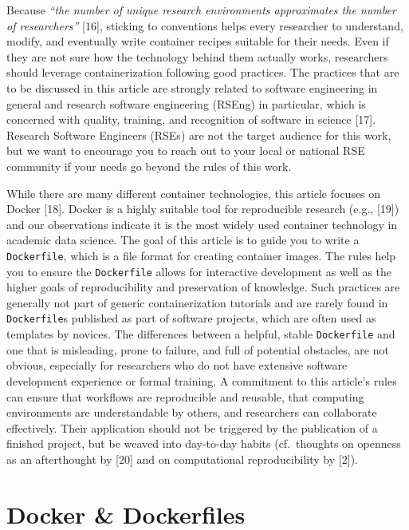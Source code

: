 \documentclass[10pt,letterpaper]{article}
\begin{document}
Because \emph{``the number of unique research environments approximates
the number of researchers''} {[}16{]}, sticking to conventions helps
every researcher to understand, modify, and eventually write container
recipes suitable for their needs. Even if they are not sure how the
technology behind them actually works, researchers should leverage
containerization following good practices. The practices that are to be
discussed in this article are strongly related to software engineering
in general and research software engineering (RSEng) in particular,
which is concerned with quality, training, and recognition of software
in science {[}17{]}. Research Software Engineers (RSEs) are not the
target audience for this work, but we want to encourage you to reach out
to your local or national RSE community if your needs go beyond the
rules of this work.

While there are many different container technologies, this article
focuses on Docker {[}18{]}. Docker is a highly suitable tool for
reproducible research (e.g., {[}19{]}) and our observations indicate it
is the most widely used container technology in academic data science.
The goal of this article is to guide you to write a \texttt{Dockerfile},
which is a file format for creating container images. The rules help you
to ensure the \texttt{Dockerfile} allows for interactive development as
well as the higher goals of reproducibility and preservation of
knowledge. Such practices are generally not part of generic
containerization tutorials and are rarely found in \texttt{Dockerfile}s
published as part of software projects, which are often used as
templates by novices. The differences between a helpful, stable
\texttt{Dockerfile} and one that is misleading, prone to failure, and
full of potential obstacles, are not obvious, especially for researchers
who do not have extensive software development experience or formal
training. A commitment to this article's rules can ensure that workflows
are reproducible and reusable, that computing environments are
understandable by others, and researchers can collaborate effectively.
Their application should not be triggered by the publication of a
finished project, but be weaved into day-to-day habits (cf.~thoughts on
openness as an afterthought by {[}20{]} and on computational
reproducibility by {[}2{]}).

\hypertarget{docker-dockerfiles}{%
\section{Docker \& Dockerfiles}\label{docker-dockerfiles}}
\end{document}
